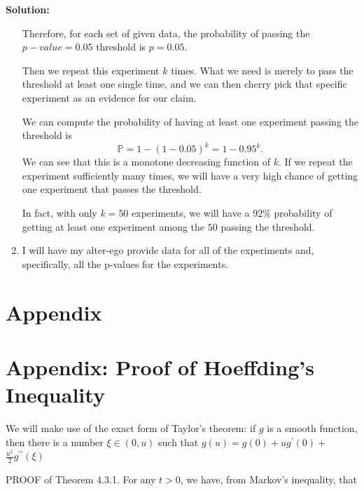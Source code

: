 \documentclass[13pt]{article}
\theoremstyle{definition}
\newenvironment{solution}
{\color{C2}\begin{framed}\begingroup\textbf{Solution:} }
  {\endgroup\end{framed}}
\theoremstyle{remark}
\newcommand{\PP}{\mathbb{P}}
\begin{document}
\begin{solution}
\begin{enumerate}[label=(\alph*),topsep=0pt]
    Therefore, for each set of given data, the probability of passing the $p-value=0.05$ threshold is $p=0.05$.
    
    Then we repeat this experiment $k$ times. What we need is merely to pass the threshold at least one single time, and we can then cherry pick that specific experiment as an evidence for our claim.
    
    We can compute the probability of having at least one experiment passing the threshold is 
    \[
    \PP = 1- (1-0.05)^k = 1-0.95^k.
    \]
    We can see that this is a monotone decreasing function of $k$. If we repeat the experiment sufficiently many times, we will have a very high chance of getting one experiment that passes the threshold.
    
    In fact, with only $k=50$ experiments, we will have a $92\%$ probability of getting at least one experiment among the $50$ passing the threshold. 
    \item I will have my alter-ego provide data for all of the experiments and, specifically, all the p-values for the experiments.

    \end{enumerate}
\end{solution}


























\section{Appendix}

\section{Appendix: Proof of Hoeffding's Inequality}
We will make use of the exact form of Taylor's theorem: if $g$ is a smooth function, then there is a number $\xi \in(0, u)$ such that $g(u)=g(0)+u g^{\prime}(0)+$ $\frac{u^{2}}{2} g^{\prime \prime}(\xi)$

PROOF of Theorem 4.3.1. For any $t>0$, we have, from Markov's inequality, that
\end{document}

